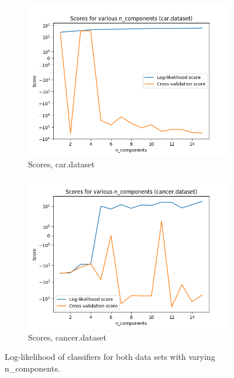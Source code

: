 \documentclass{article}
\begin{document}
        \begin{figure}[htb]
        \centering

          \begin{subfigure}{0.4\textwidth}
            \includegraphics[width=\linewidth]{out/em/car-components-testing.png}
            \caption{Scores, car.dataset}
            \label{fig:em-comp-car}
          \end{subfigure}\hfil
          \begin{subfigure}{0.4\textwidth}
            \includegraphics[width=\linewidth]{out/em/cancer-components-testing.png}
            \caption{Scores, cancer.dataset}
            \label{fig:em-comp-cancer}
          \end{subfigure}

        \caption{Log-likelihood of classifiers for both data sets with varying n\_components.}
        \label{fig:em-comp}
        \end{figure}
\end{document}
